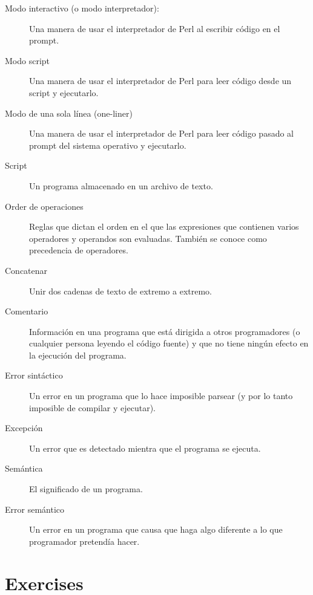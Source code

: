 \begin{description}
\item[Modo interactivo (o modo interpretador):] Una manera de usar el interpretador 
de Perl al escribir código en el prompt.

\item[Modo script] Una manera de usar el interpretador 
de Perl para leer código desde un script y ejecutarlo.

\item[Modo de una sola línea (one-liner)] Una manera de usar el interpretador 
de Perl para leer código pasado al prompt del sistema operativo 
y ejecutarlo.

\item[Script] Un programa almacenado en un archivo de texto.

\item[Order de operaciones]  Reglas que dictan el orden en el que las expresiones
que contienen varios operadores y operandos son evaluadas.
También se conoce como precedencia de operadores.

\item[Concatenar]  Unir dos cadenas de texto de extremo a extremo.

\item[Comentario]  Información en una programa que está dirigida a otros programadores
(o cualquier persona leyendo el código fuente) y que no tiene ningún efecto en 
la ejecución del programa.

\item[Error sintáctico]  Un error en un programa que lo hace imposible
parsear (y por lo tanto imposible de compilar y ejecutar).

\item[Excepción]  Un error que es detectado mientra que el programa se ejecuta.

\item[Semántica]  El significado de un programa.

\item[Error semántico] Un error en un programa que causa que haga algo 
diferente a lo que programador pretendía hacer.

\end{description}


\section{Exercises}

